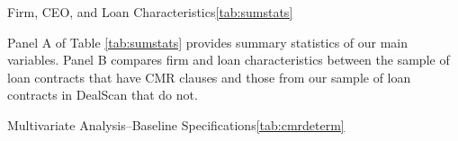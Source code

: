 \documentclass[a4paper,12pt]{article}
\begin{document}
\begin{singlespace}
\renewcommand{\tablesize}{\footnotesize}


\begin{papertable}{Firm, CEO, and Loan Characteristics}{\ref{tab:sumstats}}{} \label{tab:sumstats}

    Panel A of Table \ref{tab:sumstats} provides summary statistics of our main variables.
    Panel B compares firm and loan characteristics between the sample of loan contracts that have CMR clauses and those from our sample of loan contracts in DealScan that do not.
    \postamble

    \startdata
    \def\arraystretch{1.1}
    
    \splittable
    \setlength\tabcolsep{5pt}
    
\end{papertable}


\begin{papertable}{Multivariate Analysis--Baseline Specifications}{\ref{tab:cmrdeterm}}{} \label{tab:cmrdeterm}


\end{papertable}
\end{singlespace}
\end{document}
